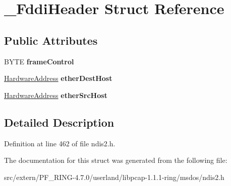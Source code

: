 \hypertarget{struct___fddi_header}{
\section{\_\-FddiHeader Struct Reference}
\label{struct___fddi_header}
}
\subsection*{Public Attributes}
\begin{DoxyCompactItemize}
\item 
\hypertarget{struct___fddi_header_ad675273bb6c7e516f7e22e30c6f068b8}{
BYTE {\bfseries frameControl}}
\label{struct___fddi_header_ad675273bb6c7e516f7e22e30c6f068b8}

\item 
\hypertarget{struct___fddi_header_af58d15c3ee818a1d45c12f6b796b53d9}{
\hyperlink{union___hardware_address}{HardwareAddress} {\bfseries etherDestHost}}
\label{struct___fddi_header_af58d15c3ee818a1d45c12f6b796b53d9}

\item 
\hypertarget{struct___fddi_header_a7be459e5976028e96d22a6416d348855}{
\hyperlink{union___hardware_address}{HardwareAddress} {\bfseries etherSrcHost}}
\label{struct___fddi_header_a7be459e5976028e96d22a6416d348855}

\end{DoxyCompactItemize}


\subsection{Detailed Description}


Definition at line 462 of file ndis2.h.



The documentation for this struct was generated from the following file:\begin{DoxyCompactItemize}
\item 
src/extern/PF\_\-RING-\/4.7.0/userland/libpcap-\/1.1.1-\/ring/msdos/ndis2.h\end{DoxyCompactItemize}

